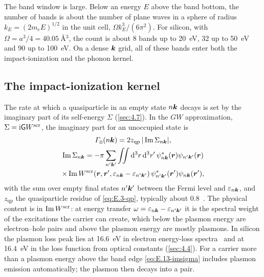 The band window is large. Below an energy $E$ above the band bottom, the number of bands is about the number of plane waves in a sphere of radius $k_E = (2m_eE)^{1/2}$ in the unit cell, $\Omega k_E^3/(6\pi^2)$. For silicon, with $\Omega = a^3/4 = \SI{40.05}{\angstrom^3}$, the count is about 8 bands up to \SI{20}{eV}, 32 up to \SI{50}{eV} and 90 up to \SI{100}{eV}. On a dense $\bm{k}$ grid, all of these bands enter both the impact-ionization and the phonon kernel.

\subsection{The impact-ionization kernel}

The rate at which a quasiparticle in an empty state $n\bm{k}$ decays is set by the imaginary part of its self-energy $\Sigma$ (\cref{sec:4.7}). In the $GW$ approximation, $\Sigma = \mathrm{i}\mathsf{G} W^{\mathrm{scr}}$, the imaginary part for an unoccupied state is~\cite[Eqs.~(1)--(2)]{kotani2010impact}
\begin{gather}
  \varGamma_{\mathrm{ii}}(n\bm{k}) = 2z_{\mathrm{qp}}\,|\operatorname{Im}\Sigma_{n\bm{k}}|, \nonumber\\
  \operatorname{Im}\Sigma_{n\bm{k}} = -\pi\sum_{n'\bm{k}'}\iint\mathrm{d}^3r\,\mathrm{d}^3r'\,
  \psi^*_{n\bm{k}}(\bm{r})\psi_{n'\bm{k}'}(\bm{r})\nonumber\\
  \times\operatorname{Im} W^{\mathrm{scr}}(\bm{r}, \bm{r}', \varepsilon_{n\bm{k}} - \varepsilon_{n'\bm{k}'})\,
  \psi^*_{n'\bm{k}'}(\bm{r}')\psi_{n\bm{k}}(\bm{r}'),
  \label{eq:E.13-imsigma}
\end{gather}
with the sum over empty final states $n'\bm{k}'$ between the Fermi level and $\varepsilon_{n\bm{k}}$, and $z_{\mathrm{qp}}$ the quasiparticle residue of \cref{eq:E.3-qp}, typically about 0.8~\cite[Sect.~II]{kotani2010impact}. The physical content is in $\operatorname{Im} W^{\mathrm{scr}}$: at energy transfer $\omega = \varepsilon_{n\bm{k}} - \varepsilon_{n'\bm{k}'}$ it is the spectral weight of the excitations the carrier can create, which below the plasmon energy are electron--hole pairs and above the plasmon energy are mostly plasmons. In silicon the plasmon loss peak lies at \SI{16.6}{eV} in electron energy-loss spectra~\cite[Table~I]{ramanathan2020ionization} and at \SI{16.4}{eV} in the loss function from optical constants (\cref{sec:4.4}). For a carrier more than a plasmon energy above the band edge \cref{eq:E.13-imsigma} includes plasmon emission automatically; the plasmon then decays into a pair.

